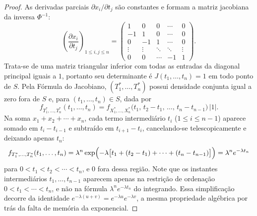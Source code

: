 \documentclass[12pt,portuguese]{article}
\theoremstyle{definition}
\theoremstyle{plainexercise}
\theoremstyle{starredexercise}
\theoremstyle{definition}
\begin{document}
\begin{proof}
As derivadas parciais $\partial x_i/\partial t_j$ são constantes e formam a
matriz jacobiana da inversa $\Phi^{-1}$:
\[
  \left(\frac{\partial x_i}{\partial t_j}\right)_{1\leqslant i,j\leqslant n}
  =\begin{pmatrix}
     1      & 0      & 0      & \cdots & 0 \\
    -1      & 1      & 0      & \cdots & 0 \\
     0      & -1     & 1      & \cdots & 0 \\
     \vdots & \vdots & \ddots & \ddots & \vdots \\
     0      & 0      & \cdots & -1     & 1
   \end{pmatrix}.
\]
Trata-se de uma matriz triangular inferior com todas as entradas da diagonal
principal iguais a $1$, portanto seu determinante é $J(t_1,\ldots,t_n)=1$ em
todo ponto de $S$. Pela Fórmula do Jacobiano, $(T_1^*,\ldots,T_n^*)$ possui
densidade conjunta igual a zero fora de $S$ e, para $(t_1,\ldots,t_n)\in S$,
dada por
\[
  f_{T_1^*,\ldots,T_n^*}(t_1,\ldots,t_n)
  =f_{X_1^*,\ldots,X_n^*}\bigl(t_1,\,t_2-t_1,\,\ldots,\,t_n-t_{n-1}\bigr)\,|1|.
\]
Na soma $x_1+x_2+\cdots+x_n$, cada termo intermediário $t_i$ ($1\leqslant i\leqslant n-1$)
aparece somado em $t_i-t_{i-1}$ e subtraído em $t_{i+1}-t_i$, cancelando-se
telescopicamente e deixando apenas $t_n$:
\begin{equation}\label{eq:densidade-conjunta-chegadas}
  f_{T_1^*,\ldots,T_n^*}(t_1,\ldots,t_n)
  =\lambda^n\exp\Bigl(-\lambda\bigl[t_1+(t_2-t_1)+\cdots+(t_n-t_{n-1})\bigr]\Bigr)
  =\lambda^n e^{-\lambda t_n}
\end{equation}
para $0<t_1<t_2<\cdots<t_n$, e $0$ fora dessa região. Note que os instantes
intermediários $t_1,\ldots,t_{n-1}$ aparecem apenas na restrição de ordenação
$0<t_1<\cdots<t_n$, e não na fórmula $\lambda^n e^{-\lambda t_n}$ do integrando.
Essa simplificação decorre da identidade $e^{-\lambda(u+v)}=e^{-\lambda u}e^{-\lambda v}$,
a mesma propriedade algébrica por trás da falta de memória da exponencial.


\end{proof}
\end{document}
